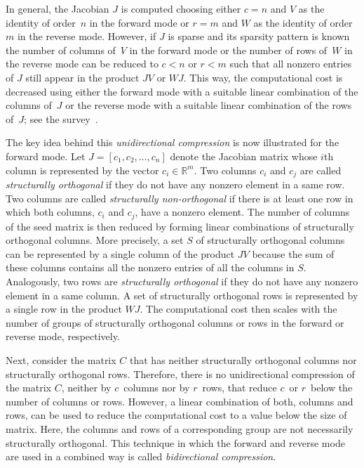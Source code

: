 \documentclass[12pt, oneside]{book}
\newcommand{\setR}{\ensuremath{\mathbb{R}}}
\newcommand{\col}{\ensuremath{c}}
\newcommand{\row}{\ensuremath{r}}
\begin{document}
In general, the Jacobian $J$ is computed choosing either $c=n$ and $V$ as the identity of
order~$n$ in the forward mode or $r = m$ and $W$ as the identity of order $m$ in the
reverse mode. However, if $J$ is sparse and its sparsity pattern is known the number of
columns of~$V$ in the forward mode or the number of rows of~$W$ in the reverse mode can
be reduced to $\col < n$ or $\row < m$ such that all nonzero entries of $J$ still appear
in the product $JV$ or $WJ$. This way, the computational cost is decreased using either
the forward mode with a suitable linear combination of the columns of~$J$ or the reverse
mode with a suitable linear combination of the rows of~$J$; see the
survey~\cite{Gebremedhin05whatcolor}.

The key idea behind this \emph{unidirectional compression} is now illustrated for the
forward mode. Let $J=[c_1, c_2, \dots, c_n]$ denote the Jacobian matrix whose $i$th
column is represented by the vector $c_i \in \setR^m$. Two columns $c_i$ and $c_j$ are
called \emph{structurally orthogonal} if they do not have any nonzero element in a same
row. Two columns are called \emph{structurally non-orthogonal} if there is at least one
row in which both columns, $c_i$ and $c_j$, have a nonzero element. The number of columns
of the seed matrix is then reduced by forming linear combinations of structurally
orthogonal columns. More precisely, a set $S$ of structurally orthogonal columns can be
represented by a single column of the product $JV$ because the sum of these columns
contains all the nonzero entries of all the columns in $S$. Analogously, two rows are
\emph{structurally orthogonal} if they do not have any nonzero element in a same column.
A set of structurally orthogonal rows is represented by a single row in the product $WJ$.
The computational cost then scales with the number of groups of structurally orthogonal
columns or rows in the forward or reverse mode, respectively.

Next, consider the matrix $C$ that has neither structurally orthogonal columns nor
structurally orthogonal rows. Therefore, there is no unidirectional compression of the
matrix $C$, neither by \col\ columns nor by \row\ rows, that reduce \col\ or \row\ below
the number of columns or rows. However, a linear combination of both, columns and rows, can be used to
reduce the computational cost to a value below the size of matrix. Here, the columns and rows of a
corresponding group are not necessarily structurally orthogonal. This technique in which
the forward and reverse mode are used in a combined way is called \emph{bidirectional
compression}. 
\end{document}
